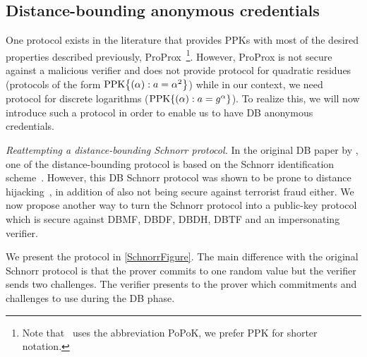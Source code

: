 \subsection{Distance-bounding anonymous credentials}%
\label{DB-anon-cred}


One protocol exists in the literature that provides \acp{PPK} with most of the desired properties described previously, ProProx~\cite{ProProx}\footnote{Note that~\cite{ProProx} uses the abbreviation PoPoK, we prefer \acs{PPK} for shorter notation.}.
However, ProProx is not secure against a malicious verifier and does not provide  protocol for quadratic residues (\ie protocols of the form \(\PPK[\alpha][a = \alpha^2]\)) while in our context, we need  protocol for discrete logarithms (\ie \(\PPK[\alpha][a = g^\alpha]\)).
To realize this, we will now introduce such a protocol in order to enable us to have \ac{DB} anonymous credentials.


\emph{Reattempting a distance-bounding Schnorr protocol.}
In the original \ac{DB} paper by \citet{DistanceBounding}, one of the distance-bounding protocol is based on the Schnorr identification scheme~\cite{Schnorr}.
However, this \ac{DB} Schnorr protocol was shown to be prone to distance hijacking~\cite{DistanceHijacking}, in addition of also not being secure against terrorist fraud either.
We now propose another way to turn the Schnorr protocol into a public-key  protocol which is secure against \ac{DBMF}, \ac{DBDF}, \ac{DBDH}, \ac{DBTF} and an impersonating verifier.

We present the protocol in \cref{SchnorrFigure}.
The main difference with the original Schnorr protocol is that the prover commits to one random value but the verifier sends two challenges.
The verifier presents to the prover which commitments and challenges to use during the \ac{DB} phase.

